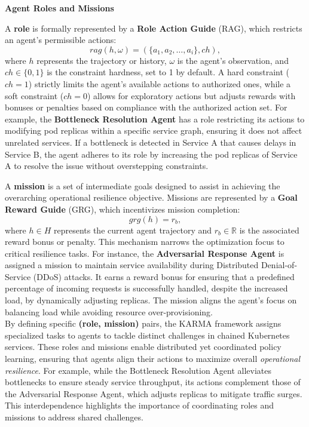 \documentclass[conference]{IEEEtran}
\begin{document}
\noindent \textbf{Agent Roles and Missions}

A \textbf{role} is formally represented by a \textbf{Role Action Guide} (RAG), which restricts an agent's permissible actions:
$$
rag(h, \omega) = (\{a_1, a_2, \dots, a_i\}, ch),
$$
where \(h\) represents the trajectory or history, \(\omega\) is the agent's observation, and \(ch \in \{0,1\}\) is the constraint hardness, set to 1 by default. A hard constraint (\(ch = 1\)) strictly limits the agent's available actions to authorized ones, while a soft constraint (\(ch = 0\)) allows for exploratory actions but adjusts rewards with bonuses or penalties based on compliance with the authorized action set. For example, the \textbf{Bottleneck Resolution Agent} has a role restricting its actions to modifying pod replicas within a specific service graph, ensuring it does not affect unrelated services. If a bottleneck is detected in Service A that causes delays in Service B, the agent adheres to its role by increasing the pod replicas of Service A to resolve the issue without overstepping constraints.

A \textbf{mission} is a set of intermediate goals designed to assist in achieving the overarching operational resilience objective. Missions are represented by a \textbf{Goal Reward Guide} (GRG), which incentivizes mission completion:
$$
grg(h) = r_b,
$$
where \(h \in H\) represents the current agent trajectory and \(r_b \in \mathbb{R}\) is the associated reward bonus or penalty. This mechanism narrows the optimization focus to critical resilience tasks. For instance, the \textbf{Adversarial Response Agent} is assigned a mission to maintain service availability during Distributed Denial-of-Service (DDoS) attacks. It earns a reward bonus for ensuring that a predefined percentage of incoming requests is successfully handled, despite the increased load, by dynamically adjusting replicas. The mission aligns the agent's focus on balancing load while avoiding resource over-provisioning.\\

By defining specific \textbf{(role, mission)} pairs, the KARMA framework assigns specialized tasks to agents to tackle distinct challenges in chained Kubernetes services. These roles and missions enable distributed yet coordinated policy learning, ensuring that agents align their actions to maximize overall \textit{operational resilience}. For example, while the Bottleneck Resolution Agent alleviates bottlenecks to ensure steady service throughput, its actions complement those of the Adversarial Response Agent, which adjusts replicas to mitigate traffic surges. This interdependence highlights the importance of coordinating roles and missions to address shared challenges.
\end{document}
